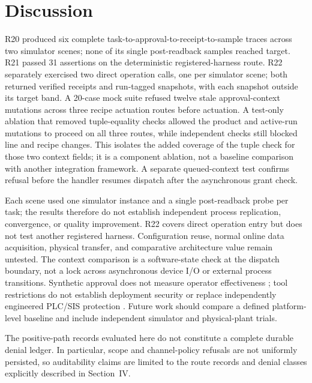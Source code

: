\section{Discussion}
\label{sec:limits}
R20 produced six complete task-to-approval-to-receipt-to-sample traces across
two simulator scenes; none of its single post-readback samples reached target.
R21 passed 31 assertions on the deterministic registered-harness route. R22
separately exercised two direct operation calls, one per simulator scene;
both returned verified receipts and run-tagged snapshots, with each snapshot
outside its target band. A 20-case mock suite refused twelve stale
approval-context mutations across three recipe actuation routes before
actuation. A test-only ablation that removed tuple-equality checks allowed the
product and active-run mutations to proceed on all three routes, while
independent checks still blocked line and recipe changes. This isolates the
added coverage of the tuple check for those two context fields; it is a
component ablation, not a baseline comparison with another integration
framework. A separate queued-context test confirms refusal before the handler
resumes dispatch after the asynchronous grant check.

Each scene used one simulator instance and a single post-readback probe per
task; the results therefore do not establish independent process replication,
convergence, or quality improvement. R22 covers direct operation entry but
does not test another registered harness. Configuration reuse, normal online
data acquisition, physical transfer, and comparative architecture value
remain untested. The context comparison is a software-state check at the
dispatch boundary, not a lock across asynchronous device I/O or external
process transitions. Synthetic approval does not measure
operator effectiveness
\cite{parasuramanmanzey2010complacency,parasuraman2000model,bainbridge1983ironies};
tool restrictions do not establish deployment security
\cite{greshake2023injection,liu2024pinjection,iec62443-3-3} or replace
independently engineered PLC/SIS protection \cite{iec61511}. Future work
should compare a defined platform-level baseline and include independent
simulator and physical-plant trials.

The positive-path records evaluated here do not constitute a complete durable
denial ledger. In particular, scope and channel-policy refusals are not
uniformly persisted, so auditability claims are limited to the route records
and denial classes explicitly described in Section~IV.

